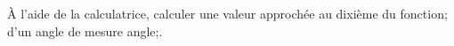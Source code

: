 \documentclass[exercice]{thedocument}%
\begin{document}
%
À l'aide de la calculatrice, calculer une valeur approchée au dixième du
\<fonction; d'un angle de mesure \<angle;.\vskip100pt
\end{document}
